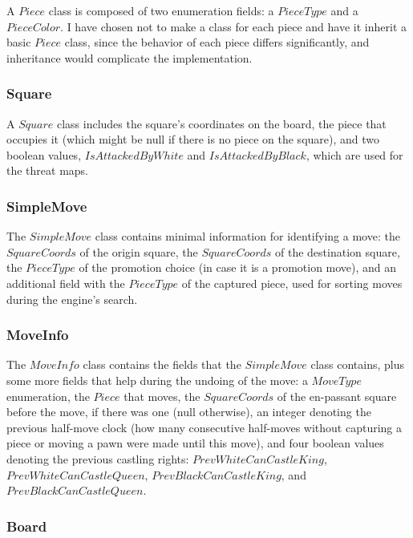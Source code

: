 A $Piece$ class is composed of two enumeration fields: a $PieceType$ and a $PieceColor$. I have chosen not to make a class for each piece and have it inherit a basic $Piece$ class, since the behavior of each piece differs significantly, and inheritance would complicate the implementation.

\subsubsection{Square}
\label{subsubsec:ch5sec1subsec2subsubsec3}

A $Square$ class includes the square's coordinates on the board, the piece that occupies it (which might be null if there is no piece on the square), and two boolean values, $IsAttackedByWhite$ and $IsAttackedByBlack$, which are used for the threat maps.

\subsubsection{SimpleMove}
\label{subsubsec:ch5sec1subsec2subsubsec4}

The $SimpleMove$ class contains minimal information for identifying a move: the $SquareCoords$ of the origin square, the $SquareCoords$ of the destination square, the $PieceType$ of the promotion choice (in case it is a promotion move), and an additional field with the $PieceType$ of the captured piece, used for sorting moves during the engine's search.

\subsubsection{MoveInfo}
\label{subsubsec:ch5sec1subsec2subsubsec5}

The $MoveInfo$ class contains the fields that the $SimpleMove$ class contains, plus some more fields that help during the undoing of the move: a $MoveType$ enumeration, the $Piece$ that moves, the $SquareCoords$ of the en-passant square before the move, if there was one (null otherwise), an integer denoting the previous half-move clock (how many consecutive half-moves without capturing a piece or moving a pawn were made until this move), and four boolean values denoting the previous castling rights: $PrevWhiteCanCastleKing$, $PrevWhiteCanCastleQueen$, $PrevBlackCanCastleKing$, and $PrevBlackCanCastleQueen$.

\subsubsection{Board}
\label{subsubsec:ch5sec1subsec2subsubsec6}

